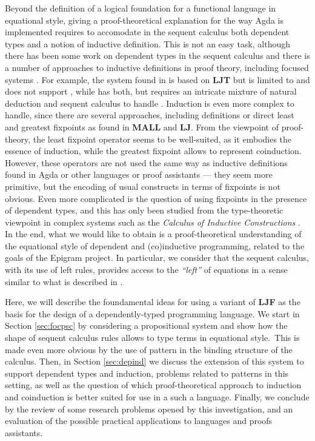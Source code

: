 \documentclass[creativecommons]{eptcs/eptcs}
\newcommand{\LJT}{\textbf{{LJT}}\xspace}
\newcommand{\LJF}{\textbf{{LJF}}\xspace}
\newcommand{\muLJ}{\textbf{{LJ}}\xspace}
\newcommand{\muMALL}{\textbf{{MALL}}\xspace}
\begin{document}
Beyond the definition of a logical foundation for a functional language in
equational style, giving a proof-theoretical explanation for the way Agda
is implemented requires to accomodate in the sequent calculus both dependent
types and a notion of inductive definition. This is not an easy task, although
there has been some work on dependent types in the sequent calculus
\cite{dyckhoff:lengrand:mckinna:11:focpts} and there is a number of
approaches to inductive definitions in proof theory, including focused
systems \cite{baelde:12:mumall}. For example, the system found in
\cite{dyckhoff:lengrand:mckinna:11:focpts} is based on \LJT but is limited
to  and does not support , while \cite{dyckhoff:pinto:98:seqdep}
has both, but requires an intricate mixture of natural deduction and sequent
calculus to handle . Induction is even more complex
to handle, since there are several approaches, including
definitions \cite{schroeder-heister:93:defr} or direct least and
greatest fixpoints as found in \muMALL \cite{baelde:12:mumall} and
\muLJ \cite{baelde:phd}. From the viewpoint of proof-theory, the least
fixpoint operator  seems to be well-suited, as it embodies
the essence of induction, while the greatest fixpoint  allows to
represent coinduction. However, these operators are not used the same way
as inductive definitions found in Agda or other languages or proof assistants
--- they seem more primitive, but the encoding of usual constructs in terms
of fixpoints is not obvious. Even more complicated is the question of using
fixpoints in the presence of dependent types, and this has only been studied
from the type-theoretic viewpoint in complex systems such as the \emph{Calculus
of Inductive Constructions} \cite{coquand:paulin:88:cic}. In the end, what
we would like to obtain is a proof-theoretical understanding of the
equational style of dependent and (co)inductive programming, related to the
goals of the Epigram project. In particular, we consider that the sequent
calculus, with its use of left rules, provides access to the
\emph{``left''} of equations in a sense similar to what is
described in \cite{mcbride:mckinna:04:left}.

Here, we will describe the foundamental ideas for using a variant of \LJF
as the basis for the design of a dependently-typed programming language.
We start in Section \ref{sec:focpsc} by considering a propositional system
and show how the shape of sequent calculus rules allows to type terms in
equational style.~This is made even more obvious by the use of pattern
in the binding structure of the calculus. Then, in Section \ref{sec:depind}
we discuss the extension of this system to support dependent types and
induction, problems related to patterns in this setting, as well as the
question of which proof-theoretical approach to induction and coinduction
is better suited for use in a such a language. Finally, we conclude by
the review of some research problems opened by this investigation, and
an evaluation of the possible practical applications to languages and
proofs assistants.
\end{document}
